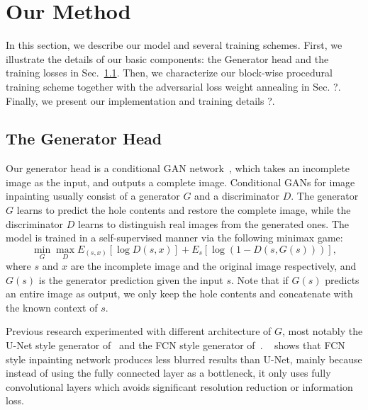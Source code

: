 \section{Our Method}

In this section, we describe our model and several training schemes. First, we illustrate the details of our basic components: the Generator head and the training losses in Sec.~\ref{sec:resnet_head}. Then, we characterize our block-wise procedural training scheme together with the adversarial loss weight annealing in Sec. ?. Finally, we present our implementation and training details ?. 

\subsection{The Generator Head}
\label{sec:resnet_head}

Our generator head is a conditional GAN network~\cite{mirza2014conditional}, which takes an incomplete image as the input, and outputs a complete image. Conditional GANs for image inpainting usually consist of a generator $G$ and a discriminator $D$. The generator $G$ learns to predict the hole contents and restore the complete image, while the discriminator $D$ learns to distinguish real images from the generated ones. The model is trained in a self-supervised manner via the following minimax game:
\[
\min\limits_G \max\limits_D E_{(s,x)}[\log D(s,x)] + E_s[\log (1-D(s,G(s)))],
\]
where $s$ and $x$ are the incomplete image and the original image respectively, and $G(s)$ is the generator prediction given the input $s$. Note that if $G(s)$ predicts an entire image as output, we only keep the hole contents and concatenate with the known context of $s$.

Previous research experimented with different architecture of $G$, most notably the U-Net style generator of~\cite{pathak2016context} and the FCN style generator of~\cite{iizuka2017globally}. ~\cite{iizuka2017globally} shows that FCN style inpainting network produces less blurred results than U-Net, mainly because instead of using the fully connected layer as a bottleneck, it only uses fully convolutional layers which avoids significant resolution reduction or information loss.

